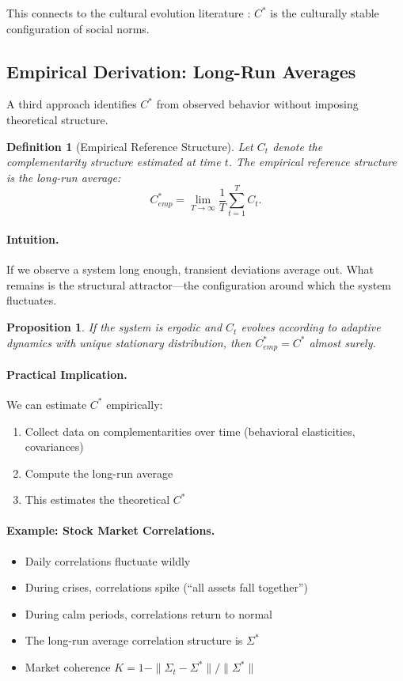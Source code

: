 \documentclass[12pt,a4paper]{article}
\newtheorem{proposition}[theorem]{Proposition}
\newtheorem{definition}[theorem]{Definition}
\begin{document}
This connects to the cultural evolution literature \citep{boydricherson,gintis2007}:
$C^*$ is the culturally stable configuration of social norms.

\subsection{Empirical Derivation: Long-Run Averages}

A third approach identifies $C^*$ from observed behavior 
without imposing theoretical structure.

\begin{definition}[Empirical Reference Structure]
Let $C_t$ denote the complementarity structure estimated at time $t$.
The \emph{empirical reference structure} is the long-run average:
\begin{equation}
  C^*_{emp} = \lim_{T \to \infty} \frac{1}{T} \sum_{t=1}^{T} C_t.
  \label{eq:empiricalcstar}
\end{equation}
\end{definition}

\paragraph{Intuition.}
If we observe a system long enough, transient deviations average out.
What remains is the structural attractor---the configuration
around which the system fluctuates.

\begin{proposition}
If the system is ergodic and $C_t$ evolves according to 
adaptive dynamics with unique stationary distribution,
then $C^*_{emp} = C^*$ almost surely.
\end{proposition}

\paragraph{Practical Implication.}
We can estimate $C^*$ empirically:
\begin{enumerate}
  \item Collect data on complementarities over time (behavioral elasticities, covariances)
  \item Compute the long-run average
  \item This estimates the theoretical $C^*$
\end{enumerate}

\paragraph{Example: Stock Market Correlations.}
\begin{itemize}
  \item Daily correlations fluctuate wildly
  \item During crises, correlations spike (``all assets fall together'')
  \item During calm periods, correlations return to normal
  \item The long-run average correlation structure is $\Sigma^*$
  \item Market coherence $K = 1 - \|\Sigma_t - \Sigma^*\|/\|\Sigma^*\|$
\end{itemize}
\end{document}
